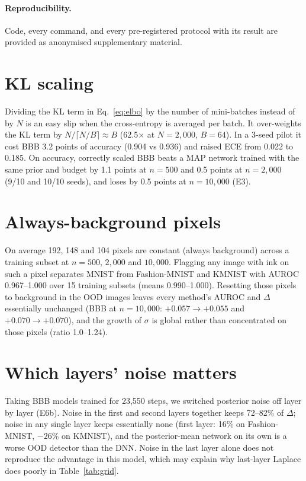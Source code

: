 \documentclass[10pt]{article}
\begin{document}
\paragraph{Reproducibility.} Code, every command, and every pre-registered
protocol with its result are provided as anonymised supplementary material.




\appendix
\section{KL scaling}\label{app:kl}
Dividing the KL term in Eq.~\ref{eq:elbo} by the number of mini-batches
instead of by $N$ is an easy slip when the cross-entropy is averaged per
batch. It over-weights the KL term by $N/\lceil N/B\rceil\approx B$ (62.5$\times$
at $N=2{,}000$, $B=64$). In a 3-seed pilot it cost BBB 3.2 points of accuracy
(0.904 vs 0.936) and raised ECE from 0.022 to 0.185. On accuracy, correctly
scaled BBB beats a MAP network trained with the same prior and budget by 1.1
points at $n=500$ and 0.5 points at $n=2{,}000$ (9/10 and 10/10 seeds), and loses by
0.5 points at $n=10{,}000$ (E3).

\section{Always-background pixels}\label{app:pixels}
On average 192, 148 and 104 pixels are constant (always background) across a
training subset at $n=500$, $2{,}000$ and $10{,}000$. Flagging any image with ink
on such a pixel separates MNIST from Fashion-MNIST and KMNIST with AUROC
0.967--1.000 over 15 training subsets (means 0.990--1.000). Resetting those
pixels to background in the OOD images leaves every method's AUROC and
$\Delta$ essentially unchanged (BBB at $n=10{,}000$: $+0.057\to+0.055$ and
$+0.070\to+0.070$), and the growth of $\sigma$ is global rather than
concentrated on those pixels (ratio 1.0--1.24).

\section{Which layers' noise matters}\label{app:layers}
Taking BBB models trained for 23{,}550 steps, we switched posterior noise off
layer by layer (E6b). Noise in the first and second layers together keeps
72--82\% of $\Delta$; noise in any single layer keeps essentially none (first
layer: 16\% on Fashion-MNIST, $-26\%$ on KMNIST), and the posterior-mean network
on its own is a worse OOD detector than the DNN. Noise in the last layer
alone does not reproduce the advantage in this model, which may explain why
last-layer Laplace does poorly in Table~\ref{tab:grid}.
\end{document}
